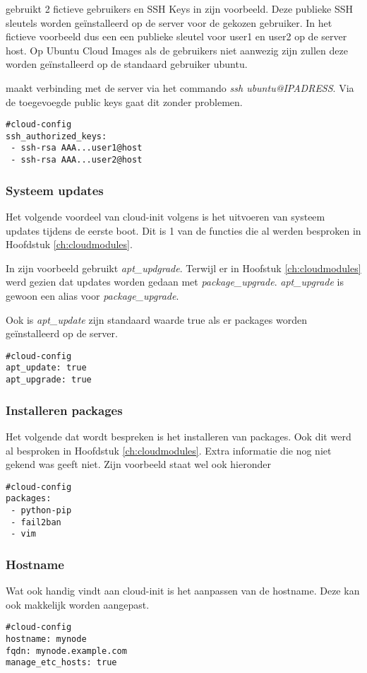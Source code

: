 \autocite{viktorpet} gebruikt 2 fictieve gebruikers en SSH Keys in zijn voorbeeld. Deze publieke SSH sleutels worden geïnstalleerd op de server voor de gekozen gebruiker. In het fictieve voorbeeld dus een een publieke sleutel voor user1 en user2 op de server host. Op Ubuntu Cloud Images als de gebruikers niet aanwezig zijn zullen deze worden geïnstalleerd op de standaard gebruiker ubuntu. 

\autocite{viktorpet} maakt verbinding met de server via het commando \textit{ssh ubuntu@IPADRESS}. Via de toegevoegde public keys gaat dit zonder problemen.
\begin{lstlisting}
#cloud-config
ssh_authorized_keys:
 - ssh-rsa AAA...user1@host
 - ssh-rsa AAA...user2@host
\end{lstlisting} 

\subsubsection{Systeem updates}
Het volgende voordeel van cloud-init volgens \autocite{viktorpet} is het uitvoeren van systeem updates tijdens de eerste boot. Dit is 1 van de functies die al werden besproken in Hoofdstuk \ref*{ch:cloudmodules}.

In zijn voorbeeld gebruikt \autocite{viktorpet} \textit{apt\_updgrade}. Terwijl er in Hoofstuk \ref*{ch:cloudmodules} werd gezien dat updates worden gedaan met \textit{package\_upgrade}. \textit{apt\_upgrade} is gewoon een alias voor \textit{package\_upgrade}.

Ook is \textit{apt\_update} zijn standaard waarde true als er packages worden geïnstalleerd op de server. 
\begin{lstlisting}
#cloud-config
apt_update: true
apt_upgrade: true
\end{lstlisting} 

\subsubsection{Installeren packages}
Het volgende dat wordt bespreken is het installeren van packages. Ook dit werd al besproken in Hoofdstuk \ref*{ch:cloudmodules}. Extra informatie die nog niet gekend was geeft \autocite{viktorpet} niet. Zijn voorbeeld staat wel ook hieronder
\begin{lstlisting}
#cloud-config
packages:
 - python-pip
 - fail2ban
 - vim
\end{lstlisting} 

\subsubsection{Hostname}
Wat \autocite{viktorpet} ook handig vindt aan cloud-init is het aanpassen van de hostname. Deze kan ook makkelijk worden aangepast.
\begin{lstlisting}
#cloud-config
hostname: mynode
fqdn: mynode.example.com
manage_etc_hosts: true
\end{lstlisting} 

